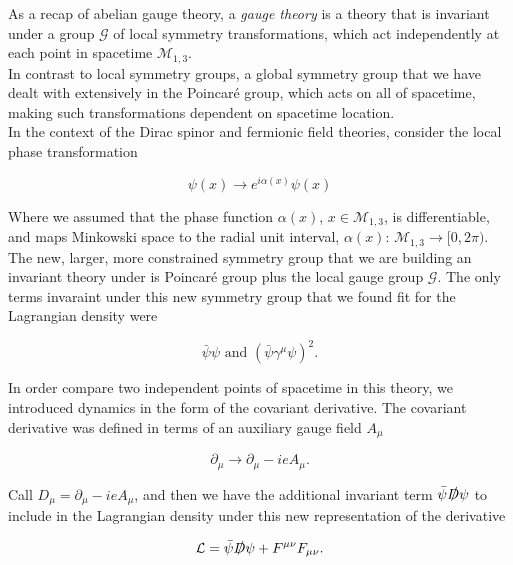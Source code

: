 
\noindent As a recap of abelian gauge theory, a \textit{gauge theory} is a theory that is invariant under a group $\mathcal{G}$ of local symmetry transformations, which act independently at each point in spacetime $\mathcal{M}_{1,3}$. \\

\noindent In contrast to local symmetry groups, a global symmetry group that we have dealt with extensively in the Poincar\'e group, which acts on all of spacetime, making such transformations dependent on spacetime location. \\

\noindent In the context of the Dirac spinor and fermionic field theories, consider the local phase transformation

\begin{equation}
\psi (x) \rightarrow e^{i \alpha (x)} \psi (x)
\end{equation}

\noindent Where we assumed that the phase function $\alpha (x)$, $x \in \mathcal{M}_{1,3}$, is differentiable, and maps Minkowski space to the radial unit interval, $\alpha (x): \, \mathcal{M}_{1,3} \rightarrow [0, 2 \pi )$. \\

\noindent The new, larger, more constrained symmetry group that we are building an invariant theory under is Poincar\'e group plus the local gauge group $\mathcal{G}$. The only terms invaraint under this new symmetry group that we found fit for the Lagrangian density were

\begin{equation}
\bar{\psi} \psi \text{ and } (\bar{\psi} \gamma^\mu \psi )^2.
\end{equation}

\noindent In order compare two independent points of spacetime in this theory, we introduced dynamics in the form of the covariant derivative. The covariant derivative was defined in terms of an auxiliary gauge field $A_\mu$

\begin{equation}
\partial_\mu \rightarrow \partial_\mu - i e A_\mu.
\end{equation}

\noindent Call $D_\mu = \partial_\mu - i e A_\mu$, and then we have the additional invariant term $\bar{\psi} \slashed{D} \psi$ to include in the Lagrangian density under this new representation of the derivative 

\begin{equation}
\mathcal{L} = \bar{\psi} \slashed{D} \psi + F^{\mu\nu} F_{\mu\nu}.
\end{equation}

